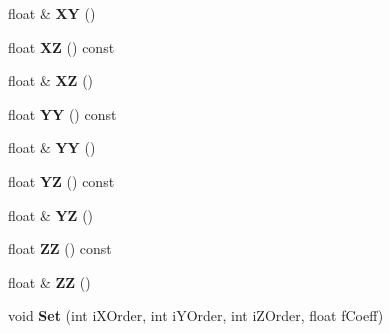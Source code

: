 \begin{DoxyCompactItemize}
\item 
float \& {\bfseries XY} ()\hypertarget{class_magnum_1_1_quadratic3_ace59a08e7f7f9939187899d1bd9c19e2}{}\label{class_magnum_1_1_quadratic3_ace59a08e7f7f9939187899d1bd9c19e2}

\item 
float {\bfseries XZ} () const \hypertarget{class_magnum_1_1_quadratic3_a202853b52dfa9cc5b76b087002c77181}{}\label{class_magnum_1_1_quadratic3_a202853b52dfa9cc5b76b087002c77181}

\item 
float \& {\bfseries XZ} ()\hypertarget{class_magnum_1_1_quadratic3_a054207ff4d3bb23920f407c149e623a5}{}\label{class_magnum_1_1_quadratic3_a054207ff4d3bb23920f407c149e623a5}

\item 
float {\bfseries YY} () const \hypertarget{class_magnum_1_1_quadratic3_a3e465708ecd990970c550a65ec4fc8a4}{}\label{class_magnum_1_1_quadratic3_a3e465708ecd990970c550a65ec4fc8a4}

\item 
float \& {\bfseries YY} ()\hypertarget{class_magnum_1_1_quadratic3_af0f3426bf9f33e0ef3225d27656fc51d}{}\label{class_magnum_1_1_quadratic3_af0f3426bf9f33e0ef3225d27656fc51d}

\item 
float {\bfseries YZ} () const \hypertarget{class_magnum_1_1_quadratic3_ab9c7c7a23788d03efa4a13a2385879ce}{}\label{class_magnum_1_1_quadratic3_ab9c7c7a23788d03efa4a13a2385879ce}

\item 
float \& {\bfseries YZ} ()\hypertarget{class_magnum_1_1_quadratic3_a21db3279a7c3ce68f0dc7a4123b201e1}{}\label{class_magnum_1_1_quadratic3_a21db3279a7c3ce68f0dc7a4123b201e1}

\item 
float {\bfseries ZZ} () const \hypertarget{class_magnum_1_1_quadratic3_a002aaffa1d007568effbced7ccd3a102}{}\label{class_magnum_1_1_quadratic3_a002aaffa1d007568effbced7ccd3a102}

\item 
float \& {\bfseries ZZ} ()\hypertarget{class_magnum_1_1_quadratic3_a0b187a4add7680657650bb6cb9368205}{}\label{class_magnum_1_1_quadratic3_a0b187a4add7680657650bb6cb9368205}

\item 
void {\bfseries Set} (int i\+X\+Order, int i\+Y\+Order, int i\+Z\+Order, float f\+Coeff)\hypertarget{class_magnum_1_1_quadratic3_a46c2f84c268acf1077abf3351bed2d0d}{}\label{class_magnum_1_1_quadratic3_a46c2f84c268acf1077abf3351bed2d0d}


\end{DoxyCompactItemize}
